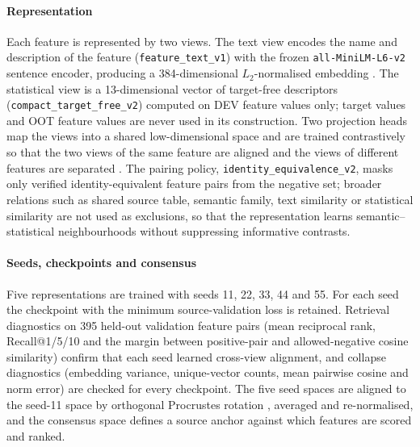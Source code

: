 \documentclass[preprint,12pt]{elsarticle}
\begin{document}
\paragraph{Representation}
Each feature is represented by two views. The text view encodes the name and description of the feature (\texttt{feature\_text\_v1}) with the frozen \texttt{all-MiniLM-L6-v2} sentence encoder, producing a 384-dimensional $L_2$-normalised embedding \cite{wang2020minilm,reimers2019}. The statistical view is a 13-dimensional vector of target-free descriptors (\texttt{compact\_target\_free\_v2}) computed on DEV feature values only; target values and OOT feature values are never used in its construction. Two projection heads map the views into a shared low-dimensional space and are trained contrastively so that the two views of the same feature are aligned and the views of different features are separated \cite{radford2021,oord2018}. The pairing policy, \texttt{identity\_equivalence\_v2}, masks only verified identity-equivalent feature pairs from the negative set; broader relations such as shared source table, semantic family, text similarity or statistical similarity are not used as exclusions, so that the representation learns semantic--statistical neighbourhoods without suppressing informative contrasts.

\paragraph{Seeds, checkpoints and consensus}
Five representations are trained with seeds 11, 22, 33, 44 and 55. For each seed the checkpoint with the minimum source-validation loss is retained. Retrieval diagnostics on 395 held-out validation feature pairs (mean reciprocal rank, Recall@1/5/10 and the margin between positive-pair and allowed-negative cosine similarity) confirm that each seed learned cross-view alignment, and collapse diagnostics (embedding variance, unique-vector counts, mean pairwise cosine and norm error) are checked for every checkpoint. The five seed spaces are aligned to the seed-11 space by orthogonal Procrustes rotation \cite{schonemann1966}, averaged and re-normalised, and the consensus space defines a source anchor against which features are scored and ranked.
\end{document}
